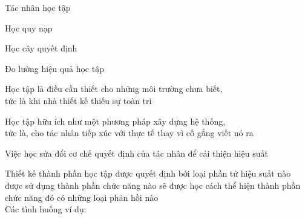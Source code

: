 \documentclass{article}
\begin{document}
\begin{huge}

\sf


\blob Tác nhân học tập

\blob Học quy nạp

\blob Học cây quyết định

\blob Đo lường hiệu quả học tập



Học tập là điều cần thiết cho những môi trường chưa biết,\\
tức là khi nhà thiết kế thiếu sự toàn tri

Học tập hữu ích như một phương pháp xây dựng hệ thống,\\
tức là, cho tác nhân tiếp xúc với thực tế thay vì cố gắng viết nó ra

Việc học sửa đổi cơ chế quyết định của tác nhân để cải thiện hiệu suất



\textwidth
{}





Thiết kế thành phần học tập được quyết định bởi\al
\blob loại phần tử hiệu suất nào được sử dụng\al
\blob thành phần chức năng nào sẽ được học\al
\blob cách thể hiện thành phần chức năng đó\al
\blob có những loại phản hồi nào \\
Các tình huống ví dụ:


\end{huge}
\end{document}
